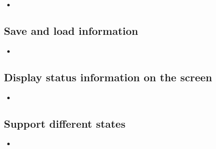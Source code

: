 \begin{itemize}
	\item
\end{itemize}

\subsection{Save and load information}

\begin{itemize}
	\item
\end{itemize}

\subsection{Display status information on the screen}

\begin{itemize}
	\item
\end{itemize}

\subsection{Support different states}

\begin{itemize}
	\item
\end{itemize}